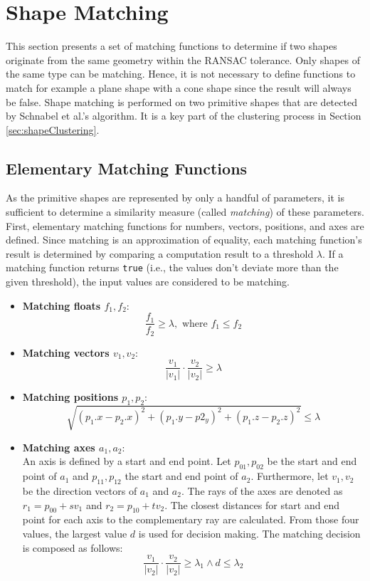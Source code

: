 \section{Shape Matching}
\label{sec:shapeMatching}

This section presents a set of matching functions to determine if two shapes originate from the same geometry within the RANSAC tolerance. Only shapes of the same type can be matching. Hence, it is not necessary to define functions to match for example a plane shape with a cone shape since the result will always be false. 
Shape matching is performed on two primitive shapes that are detected by Schnabel et al.'s algorithm. It is a key part of the clustering process in Section \ref{sec:shapeClustering}. 


\subsection{Elementary Matching Functions}
\label{sec:elementarMatchingFuns}

As the primitive shapes are represented by only a handful of parameters, it is sufficient to determine a similarity measure (called \textit{matching}) of these parameters. First, elementary matching functions for numbers, vectors, positions, and axes are defined. Since matching is an approximation of equality, each matching function's result is determined by comparing a computation result to a threshold $\lambda$. If a matching function returns \verb|true| (i.e., the values don't deviate more than the given threshold), the input values are considered to be matching. 

\begin{itemize}
    \item \textbf{Matching floats $f_1, f_2$}: 
        $$\frac{f_1}{f_2} \geq \lambda, \textrm{ where } f_1 \leq f_2$$  
    \item \textbf{Matching vectors $v_1, v_2$}: 
        $$\frac{v_1}{|v_1|} \cdot \frac{v_2}{|v_2|} \geq \lambda$$
    \item \textbf{Matching positions $p_1, p_2$}: 
        $$\sqrt{(p_1.x - p_2.x)^2 + (p_1.y - p2_y)^2 + (p_1.z - p_2.z)^2} \leq \lambda$$
    \item \textbf{Matching axes $a_1, a_2$}: 
    \\
    An axis is defined by a start and end point. Let $p_{01},p_{02}$ be the start and end point of $a_1$ and $p_{11}, p_{12}$ the start and end point of $a_2$. Furthermore, let $v_1, v_2$ be the direction vectors of $a_1$ and $a_2$. The rays of the axes are denoted as $r_1 = p_{00} + sv_1$ and $r_2 = p_{10} + tv_2$. The closest distances for start and end point for each axis to the complementary ray are calculated. From those four values, the largest value $d$ is used for decision making. The matching decision is composed as follows: 
        $$\frac{v_1}{|v_2|} \cdot \frac{v_2}{|v_2|} \geq \lambda_1 \land d \leq \lambda_2$$
\end{itemize}



